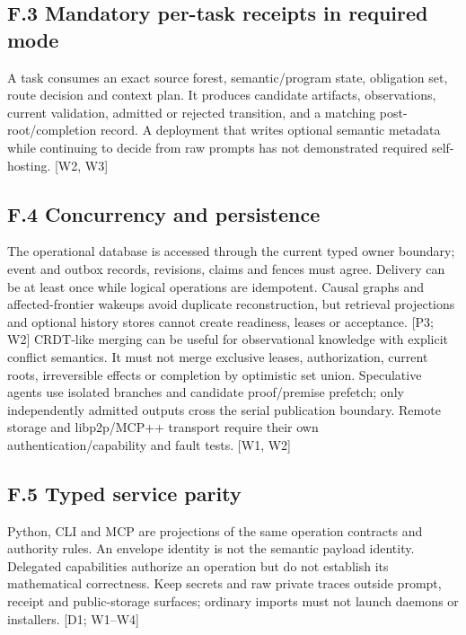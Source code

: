 \subsection*{F.3 Mandatory per-task receipts in required mode}

A task consumes an exact source forest, semantic/program state, obligation set, route decision and
context plan. It produces candidate artifacts, observations, current validation, admitted or rejected
transition, and a matching post-root/completion record. A deployment that writes optional semantic
metadata while continuing to decide from raw prompts has not demonstrated required self-hosting.
[W2, W3]

\subsection*{F.4 Concurrency and persistence}

The operational database is accessed through the current typed owner boundary; event and outbox
records, revisions, claims and fences must agree. Delivery can be at least once while logical operations
are idempotent. Causal graphs and affected-frontier wakeups avoid duplicate reconstruction, but
retrieval projections and optional history stores cannot create readiness, leases or acceptance. [P3;
W2]
CRDT-like merging can be useful for observational knowledge with explicit conflict semantics. It
must not merge exclusive leases, authorization, current roots, irreversible effects or completion by
optimistic set union. Speculative agents use isolated branches and candidate proof/premise prefetch;
only independently admitted outputs cross the serial publication boundary. Remote storage and
libp2p/MCP++ transport require their own authentication/capability and fault tests. [W1, W2]

\subsection*{F.5 Typed service parity}

Python, CLI and MCP are projections of the same operation contracts and authority rules. An
envelope identity is not the semantic payload identity. Delegated capabilities authorize an operation
but do not establish its mathematical correctness. Keep secrets and raw private traces outside prompt,
receipt and public-storage surfaces; ordinary imports must not launch daemons or installers. [D1;
W1–W4]




